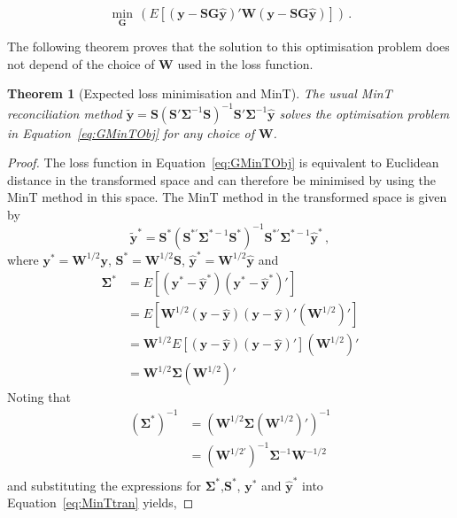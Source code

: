 \documentclass[12pt]{article}
\newtheorem{theo}{Theorem}[section]
\theoremstyle{definition}
\begin{document}
{{\color{blue}
	\begin{equation}
	\label{eq:GMinTObj}
	\underset{\bm{G}}{\min}\,(E\left[(\bm{y}-{\bm S}{\bm G}\hat{\bm{y}})'\bm{W}(\bm{y}-{\bm S}{\bm G}\hat{\bm{y}})\right])\,.
	\end{equation}
}

The following theorem proves that the solution to this optimisation problem does not depend of the choice of $\bm{W}$ used in the loss function.

\begin{theo}[Expected loss minimisation and MinT]\label{th:gdistred}
    The usual MinT reconciliation method $\tilde{\bm{y}}=\bm{S}\left(\bm{S}'\bm{\Sigma}^{-1}\bm{S}\right)^{-1}\bm{S}'\bm{\Sigma}^{-1}\hat{\bm{y}}$ solves the optimisation problem in Equation~\ref{eq:GMinTObj} for any choice of $\bm{W}$.
\end{theo}
\begin{proof}
	The loss function in Equation~\ref{eq:GMinTObj} is equivalent to Euclidean distance in the transformed space and can therefore be minimised by using the MinT method in this space.  The MinT method in the transformed space is given by 
	\begin{equation}
	\label{eq:MinTtran}
	\tilde{\bm{y}}^{*}=\bm{S}^{*}\left(\bm{S}^{*'}\bm{\Sigma}^{*-1}\bm{S}^{*}\right)^{-1}\bm{S}^{*'}\bm{\Sigma}^{*-1}\hat{\bm{y}}^{*}\,,
	\end{equation}
	where  $\bm{y}^{*}=\bm{W}^{1/2}\bm{y}$, $\bm{S}^{*}=\bm{W}^{1/2}\bm{S}$, $\hat{\bm{y}}^{*}=\bm{W}^{1/2}\hat{\bm{y}}$ and
	\begin{align*}
	\bm{\Sigma}^*&=E\left[(\bm{y}^{*}-\hat{\bm{y}}^{*})(\bm{y}^{*}-\hat{\bm{y}}^{*})'\right]\\
	&=E\left[\bm{W}^{1/2}(\bm{y}-\hat{\bm{y}})(\bm{y}-\hat{\bm{y}})'(\bm{W}^{1/2})'\right]\\
	&=\bm{W}^{1/2}E\left[(\bm{y}-\hat{\bm{y}})(\bm{y}-\hat{\bm{y}})'\right](\bm{W}^{1/2})'\\
	&=\bm{W}^{1/2}\bm{\Sigma}(\bm{W}^{1/2})'
	\end{align*}
	Noting that
	\begin{align*}
	(\bm{\Sigma}^{*})^{-1}&=\left(\bm{W}^{1/2}\bm{\Sigma}(\bm{W}^{1/2})'\right)^{-1}\\
	&=(\bm{W}^{1/2'})^{-1}\bm{\Sigma}^{-1}\bm{W}^{-1/2}\\
	\end{align*}
	and substituting the expressions for $\bm{\Sigma}^*$,${\bm{S}^*}$, $\bm{y}^{*}$ and $\hat{\bm{y}}^{*}$ into Equation~\ref{eq:MinTtran} yields, 

\end{proof}}
\end{document}
